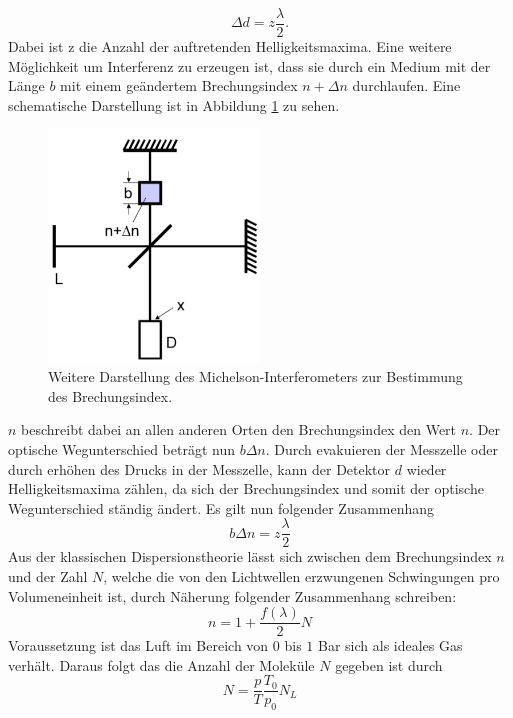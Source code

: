 \begin{equation}
  \Delta d = z \frac{\lambda}{2}.
  \label{eq:1}
\end{equation}
Dabei ist z die Anzahl der auftretenden Helligkeitsmaxima.
Eine weitere Möglichkeit um Interferenz zu erzeugen ist, dass sie durch ein Medium mit der Länge $b$ mit
einem geändertem Brechungsindex $n+\Delta n$ durchlaufen.
Eine schematische Darstellung ist in Abbildung \ref{abb:2} zu sehen.
\begin{figure}[H]
  \centering
  \includegraphics[width=0.5\textwidth]{content/Aufbau2.png}
  \caption{Weitere Darstellung des Michelson-Interferometers zur Bestimmung des Brechungsindex.\cite{1}}
  \label{abb:2}
\end{figure}
$n$ beschreibt dabei an allen anderen Orten den Brechungsindex den Wert $n$. Der optische
Wegunterschied beträgt nun $b\Delta n$.
Durch evakuieren der Messzelle oder durch erhöhen des Drucks in der Messzelle, kann der Detektor $d$
wieder Helligkeitsmaxima zählen, da sich der Brechungsindex und somit der optische
Wegunterschied ständig ändert. Es gilt nun folgender Zusammenhang
\begin{equation}
  b\Delta n = z \frac{\lambda}{2}
  \label{eq:2}
\end{equation}
Aus der klassischen Dispersionstheorie lässt sich zwischen dem Brechungsindex $n$ und
der Zahl $N$, welche die von den Lichtwellen erzwungenen Schwingungen pro Volumeneinheit ist, durch Näherung folgender
Zusammenhang schreiben:
\begin{equation*}
  n = 1+\frac{f(\lambda)}{2}N
\end{equation*}
Voraussetzung ist das Luft im Bereich von $0$ bis $1$ Bar sich als ideales Gas verhält.
Daraus folgt das die Anzahl der Moleküle $N$ gegeben ist durch
\begin{equation*}
  N = \frac{p}{T} \frac{T_0}{p_0} N_L
\end{equation*}

